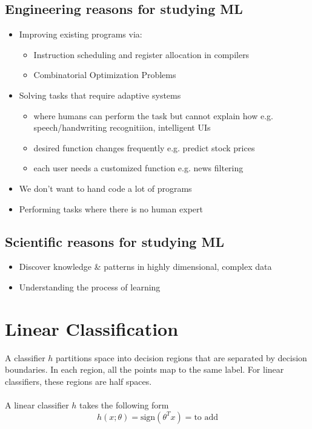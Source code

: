 \documentclass[a4paper]{article}
\begin{document}
\subsection{Engineering reasons for studying ML}
\begin{itemize}
	\item Improving existing programs via:
	\begin{itemize}[label=$\circ$]
		\item Instruction scheduling and register allocation in compilers
		\item Combinatorial Optimization Problems
	\end{itemize}
	\item Solving tasks that require adaptive systems
	\begin{itemize}[label=$\circ$]
		\item where humans can perform the task but cannot explain how e.g. speech/handwriting recognitiion, intelligent UIs
		\item desired function changes frequently e.g. predict stock prices
		\item each user needs a customized function e.g. news filtering
	\end{itemize}
	\item We don't want to hand code a lot of programs
	\item Performing tasks where there is no human expert
\end{itemize}
\subsection{Scientific reasons for studying ML}
\begin{itemize}
	\item Discover knowledge \& patterns in highly dimensional, complex data
	\item Understanding the process of learning
\end{itemize}
\newpage
\section{Linear Classification}
A classifier $h$ partitions space into decision regions that are separated by decision boundaries. In each region, all the points map to the same label. For linear classifiers, these regions are half spaces.\\
\\
A linear classifier $h$ takes the following form
$$ h(x;\theta) = \text{sign}(\theta^Tx) = \text{to add}$$
\end{document}
